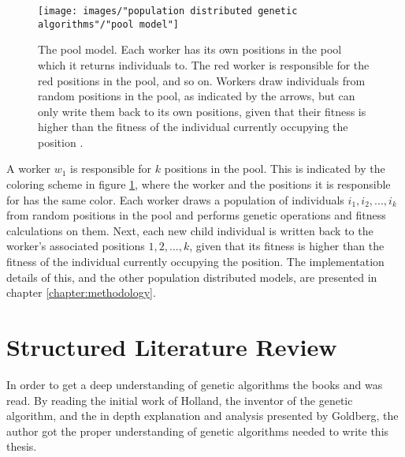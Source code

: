 \begin{figure}[h!]
\begin{center}
\texttt{[image: images/"population distributed genetic algorithms"/"pool model"]}
\caption{The pool model. Each worker has its own positions in the pool which it returns individuals to. The red worker is responsible for the red positions in the pool, and so on. Workers draw individuals from random positions in the pool, as indicated by the arrows, but can only write them back to its own positions, given that their fitness is higher than the fitness of the individual currently occupying the position \citep{Gong}.}
\label{Pool Model}
\end{center}
\end{figure}


\noindent A worker $w_1$ is responsible for $k$ positions in the pool. This is indicated by the coloring scheme in figure \ref{Pool Model}, where the worker and the positions it is responsible for has the same color. Each worker draws a population of individuals $i_1, i_2,...,i_k$ from random positions in the pool and performs genetic operations and fitness calculations on them. Next, each new child individual is written back to the worker's associated positions $1, 2,...,k$, given that its fitness is higher than the fitness of the individual currently occupying the position. The implementation details of this, and the other population distributed models, are presented in chapter \ref{chapter:methodology}.\\


\section{Structured Literature Review}\label{section:slr}
In order to get a deep understanding of genetic algorithms the books \cite{Holland} and \cite{Goldberg} was read. By reading the initial work of Holland, the inventor of the genetic algorithm, and the in depth explanation and analysis presented by Goldberg, the author got the proper understanding of genetic algorithms needed to write this thesis.\\

